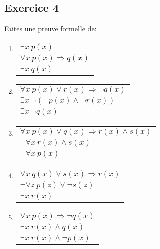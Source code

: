 \subsection*{Exercice 4}
Faites une preuve formelle de:

\begin{enumerate}

	\item \enter
\begin{flushleft}
\begin{tabular}{l}
$\exists x \ p(x)$ \\
$\forall x \ p(x) \Rightarrow q(x)$ \\
\hline
$\exists x \ q(x)$
\end{tabular}
\end{flushleft}

	\item \enter
\begin{flushleft}
\begin{tabular}{l}
$\forall x \ p(x) \vee r(x) \Rightarrow \neg q(x)$ \\
$\exists x \ \neg (\neg p(x) \land \neg r(x))$ \\
\hline
$\exists x \ \neg q(x)$
\end{tabular}
\end{flushleft}

	\item \enter
\begin{flushleft}
\begin{tabular}{l}
$\forall x \ p(x) \vee q(x) \Rightarrow r(x) \land s(x)$ \\
$\neg \forall x \ r(x) \land s(x)$ \\
\hline
$\neg \forall x \ p(x)$
\end{tabular}
\end{flushleft}


	\item \enter
\begin{flushleft}
\begin{tabular}{l}
$\forall x \ q(x) \vee s(x) \Rightarrow r(x) $ \\
$\neg \forall z \ p(z) \vee \neg s(z)$ \\
\hline
$\exists x \ r(x)$
\end{tabular}
\end{flushleft}

	\item \enter
\begin{flushleft}
\begin{tabular}{l}
$\forall x \ p(x) \Rightarrow \neg q(x)$ \\
$\exists x \ r(x) \land q(x)$ \\
\hline
$\exists x \ r(x) \land \neg p(x)$
\end{tabular}
\end{flushleft}


\end{enumerate}
